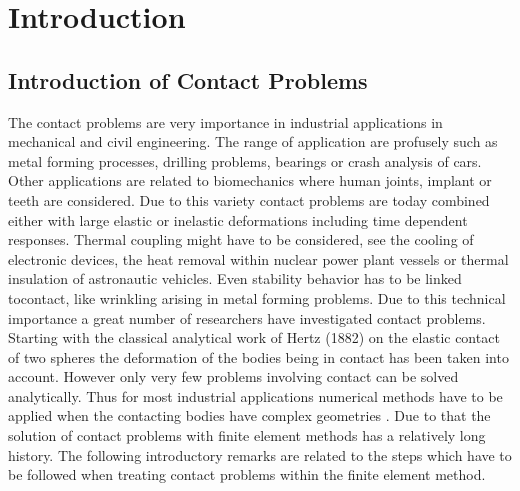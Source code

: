 
\chapter{Introduction} %

\label{Chapter1} %


\newcommand{\keyword}[1]{\textbf{#1}}
\newcommand{\tabhead}[1]{\textbf{#1}}
\newcommand{\code}[1]{\texttt{#1}}
\newcommand{\file}[1]{\texttt{\bfseries#1}}
\newcommand{\option}[1]{\texttt{\itshape#1}}


\section{Introduction of Contact Problems}
The contact problems are very importance in industrial applications in mechanical and civil engineering. The range of application are profusely such as metal forming processes, drilling problems, bearings or crash analysis of cars. Other applications are related to biomechanics where human joints, implant or teeth are considered. Due to this variety contact problems are today combined either with large elastic or inelastic deformations
including time dependent responses. Thermal coupling might have to be considered, see the cooling of electronic devices, the heat removal within nuclear power plant vessels or
thermal insulation of astronautic vehicles. Even stability behavior has to be linked tocontact, like wrinkling arising in metal forming problems. \parencite{ref1} Due to this technical importance a great number of researchers have investigated contact
problems. Starting with the classical analytical work of Hertz (1882) on the elastic contact of two spheres the deformation of the bodies being in contact has been taken into account. However only very few problems involving contact can be solved analytically. Thus for
most industrial applications numerical methods have to be applied when the contacting bodies have complex geometries . Due to that the solution of contact problems with finite
element methods has a relatively long history. \parencite{ref1}
The following introductory remarks are related to the steps which have to be followed when
treating contact problems within the finite element method. \parencite{ref1}


